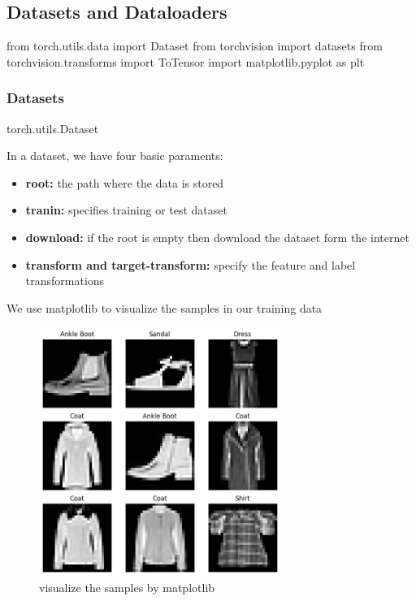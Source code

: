 \documentclass[12pt,hyperref,a4paper,UTF8]{article}
\begin{document}
\subsection{Datasets and Dataloaders}
\begin{python}
    from torch.utils.data import Dataset
    from torchvision import datasets
    from torchvision.transforms import ToTensor
    import matplotlib.pyplot as plt
\end{python}

\subsubsection{Datasets}
\begin{python}
    torch.utils.Dataset
\end{python}

In a dataset, we have four basic paraments:
\begin{itemize}
    \item \textbf{root:} the path where the data is stored
    \item \textbf{tranin:} specifies training or test dataset
    \item \textbf{download:} if the root is empty then download the dataset form the internet
    \item \textbf{transform and target-transform:} specify the feature and label transformations
\end{itemize}

We use matplotlib to visualize the samples in our training data
\begin{figure}[h]
    \centering
    \includegraphics[width=0.7\textwidth]{figures/visualize.png}
    \caption{visualize the samples by matplotlib}
\end{figure}
\end{document}
